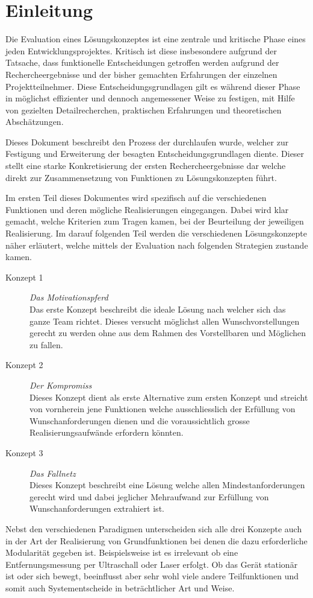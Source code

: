 \section{Einleitung}

Die Evaluation eines Lösungskonzeptes ist eine zentrale und kritische Phase
eines jeden Entwicklungsprojektes. Kritisch ist diese insbesondere aufgrund 
der Tatsache, dass funktionelle Entscheidungen getroffen werden aufgrund der
Rechercheergebnisse und der bisher gemachten Erfahrungen der einzelnen 
Projektteilnehmer. Diese Entscheidungsgrundlagen gilt es während dieser Phase
in möglichst effizienter und dennoch angemessener Weise zu festigen, mit Hilfe
von gezielten Detailrecherchen, praktischen Erfahrungen und theoretischen
Abschätzungen.

Dieses Dokument beschreibt den Prozess der durchlaufen wurde, welcher zur 
Festigung und Erweiterung der besagten Entscheidungsgrundlagen diente. Dieser
stellt eine starke Konkretisierung der ersten Rechercheergebnisse dar welche
direkt zur Zusammensetzung von Funktionen zu Lösungskonzepten führt. 

Im ersten Teil dieses Dokumentes wird spezifisch auf die verschiedenen
Funktionen und deren mögliche Realisierungen eingegangen. Dabei wird klar 
gemacht, welche Kriterien zum Tragen kamen, bei der Beurteilung der jeweiligen
Realisierung. Im darauf folgenden Teil werden die verschiedenen 
Lösungskonzepte näher erläutert, welche mittels der Evaluation nach folgenden
Strategien zustande kamen.

\begin{description}
	\item[Konzept 1] \emph{Das Motivationspferd} \\
		Das erste Konzept beschreibt die ideale Lösung nach welcher
		sich das ganze Team richtet. Dieses versucht möglichst allen
		Wunschvorstellungen gerecht zu werden ohne aus dem Rahmen
		des Vorstellbaren und Möglichen zu fallen.
	\item[Konzept 2] \emph{Der Kompromiss} \\
		Dieses Konzept dient als erste Alternative zum ersten Konzept
		und streicht von vornherein jene Funktionen welche 
		ausschliesslich der Erfüllung von Wunschanforderungen dienen
		und die voraussichtlich grosse Realisierungsaufwände 
		erfordern könnten.
	\item[Konzept 3] \emph{Das Fallnetz} \\
		Dieses Konzept beschreibt eine Lösung welche allen 
		Mindestanforderungen gerecht wird und dabei jeglicher 
		Mehraufwand zur Erfüllung von Wunschanforderungen
		extrahiert ist.
\end{description}

Nebst den verschiedenen Paradigmen unterscheiden sich alle drei Konzepte
auch in der Art der Realisierung von Grundfunktionen bei denen die dazu
erforderliche Modularität gegeben ist. Beispielsweise ist es irrelevant
ob eine Entfernungsmessung per Ultraschall oder Laser erfolgt. Ob das
Gerät stationär ist oder sich bewegt, beeinflusst aber sehr wohl viele 
andere Teilfunktionen und somit auch Systementscheide in beträchtlicher 
Art und Weise.
